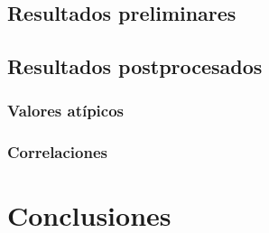 \documentclass[12pt]{book}
\begin{document}
\section{Resultados preliminares}
\section{Resultados postprocesados}
\subsection{Valores atípicos}
\subsection{Correlaciones}
\chapter{Conclusiones}
\end{document}
